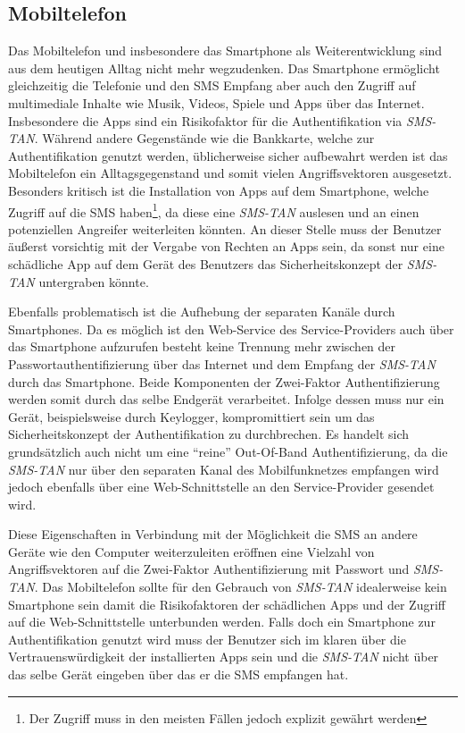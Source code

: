 \documentclass[11pt,a4paper,ngerman]{scrreprt}
\begin{document}
\subsection{Mobiltelefon}
Das Mobiltelefon und insbesondere das Smartphone als Weiterentwicklung sind aus dem heutigen Alltag nicht mehr wegzudenken. Das Smartphone ermöglicht gleichzeitig die Telefonie und den SMS Empfang aber auch den Zugriff auf multimediale Inhalte wie Musik, Videos, Spiele und Apps über das Internet. Insbesondere die Apps sind ein Risikofaktor für die Authentifikation via \textit{SMS-TAN}. Während andere Gegenstände wie die Bankkarte, welche zur Authentifikation genutzt werden, üblicherweise sicher aufbewahrt werden ist das Mobiltelefon ein Alltagsgegenstand und somit vielen Angriffsvektoren ausgesetzt. Besonders kritisch ist die Installation von Apps auf dem Smartphone, welche Zugriff auf die SMS haben\footnote{Der Zugriff muss in den meisten Fällen jedoch explizit gewährt werden}, da diese eine \textit{SMS-TAN} auslesen und an einen potenziellen Angreifer weiterleiten könnten. An dieser Stelle muss der Benutzer äußerst vorsichtig mit der Vergabe von Rechten an Apps sein, da sonst nur eine schädliche App auf dem Gerät des Benutzers das Sicherheitskonzept der \textit{SMS-TAN} untergraben könnte.

Ebenfalls problematisch ist die Aufhebung der separaten Kanäle durch Smartphones. Da es möglich ist den Web-Service des Service-Providers auch über das Smartphone aufzurufen besteht keine Trennung mehr zwischen der Passwortauthentifizierung über das Internet und dem Empfang der \textit{SMS-TAN} durch das Smartphone. Beide Komponenten der Zwei-Faktor Authentifizierung werden somit durch das selbe Endgerät verarbeitet. Infolge dessen muss nur ein Gerät, beispielsweise durch Keylogger, kompromittiert sein um das Sicherheitskonzept der Authentifikation zu durchbrechen. Es handelt sich grundsätzlich auch nicht um eine ``reine'' Out-Of-Band Authentifizierung, da die \textit{SMS-TAN} nur über den separaten Kanal des Mobilfunknetzes empfangen wird jedoch ebenfalls über eine Web-Schnittstelle an den Service-Provider gesendet wird.

Diese Eigenschaften in Verbindung mit der Möglichkeit die SMS an andere Geräte wie den Computer weiterzuleiten eröffnen eine Vielzahl von Angriffsvektoren auf die Zwei-Faktor Authentifizierung mit Passwort und \textit{SMS-TAN}. Das Mobiltelefon sollte für den Gebrauch von \textit{SMS-TAN} idealerweise kein Smartphone sein damit die Risikofaktoren der schädlichen Apps und der Zugriff auf die Web-Schnittstelle unterbunden werden. Falls doch ein Smartphone zur Authentifikation genutzt wird muss der Benutzer sich im klaren über die Vertrauenswürdigkeit der installierten Apps sein und die \textit{SMS-TAN} nicht über das selbe Gerät eingeben über das er die SMS empfangen hat.
\end{document}
